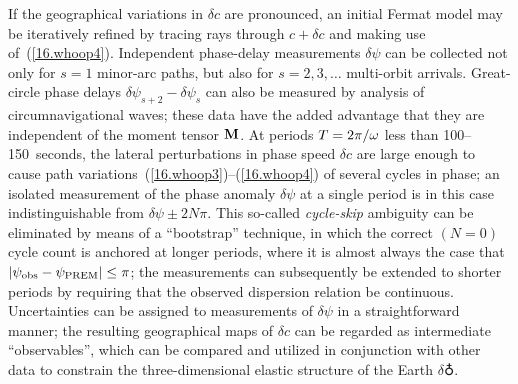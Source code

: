 If the geographical variations in $\delta c$ are pronounced,
an initial Fermat
model may be iteratively refined by tracing rays through
$c+\delta c$ and making use of~(\ref{16.whoop4}).
Independent phase-delay measurements $\delta\psi$
can be collected not only for $s=1$ minor-arc paths,
but also for $s=2,3,\ldots$ multi-orbit arrivals.
Great-circle phase delays $\delta\psi_{s+2}
-\delta\psi_s$ can also be measured by analysis
of circumnavigational waves; these data
have the added advantage that they are independent of the
moment tensor $\mbox{${\bf M}$}$.  At periods $T=2\pi/\mbox{$\omega$}$ less
than 100--150~seconds, the lateral perturbations in
phase speed $\delta c$ are large enough to cause path
variations~(\ref{16.whoop3})--(\ref{16.whoop4})
of several cycles in phase; an isolated measurement
of the phase anomaly $\delta\psi$ at a single period is in this
case indistinguishable from $\delta\psi\pm 2N\pi$.
This so-called {\em cycle-skip\/} ambiguity can
%
be eliminated by means of a ``bootstrap''
technique, in which the correct $(N=0)$
cycle count is anchored at longer periods,
where it is almost always the case that
$|\psi_{\rm obs}-\psi_{\rm PREM}|\leq\pi$;
the measurements can subsequently be extended to
shorter periods by requiring that the observed
dispersion relation be continuous.
Uncertainties can be assigned to measurements of
$\delta\psi$ in a straightforward manner;
the resulting geographical maps of $\delta c$ can be regarded
as intermediate ``observables'', which can be compared
and utilized in conjunction with other
data to constrain the three-dimensional
elastic structure of the Earth $\delta\earth$.

